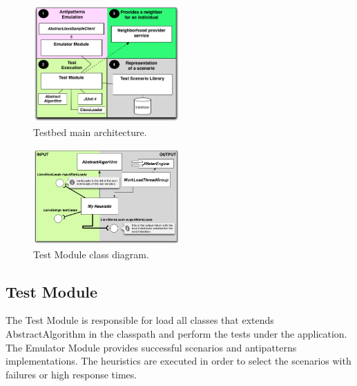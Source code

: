 \begin{figure}[h]
\centering
\includegraphics[width=0.5\textwidth]{./images/testbedarch.png}
\caption{Testbed main architecture.}
\label{fig:testbedarch}
\end{figure} 

\begin{figure}[h]
\centering
\includegraphics[width=0.5\textwidth]{./images/myheuristic.png}
\caption{Test Module class diagram.}
\label{fig:heuristicclassdiagram}
\end{figure} 



\subsection{Test Module}

The Test Module is responsible for load all classes that extends AbstractAlgorithm in the classpath and perform the tests under the application. The Emulator Module provides successful scenarios and antipatterns implementations. The heuristics are executed in order to select the scenarios with failures or high response times. 

